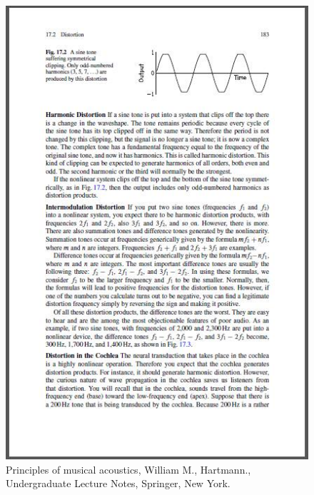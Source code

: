 \begin{figure}[!htb]
	\centering
	\includegraphics[scale=0.8]{distorsion2.jpg}
	\caption{Principles of musical acoustics, William M., Hartmann., Undergraduate Lecture Notes, Springer, New York.}
\end{figure}

